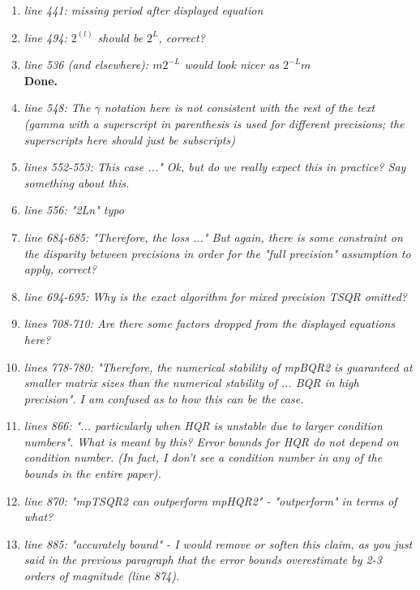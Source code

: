 \documentclass[final,onefignum,onetabnum]{siamart190516}
\begin{document}
\begin{enumerate}
    \item {\it line 441: missing period after displayed equation }
    \item {\it line 494: $2^{(l)}$ should be $2^L$, correct? }
    \item {\it line 536 (and elsewhere): $m2^{-L}$ would look nicer as $2^{-L}m$ }\\
    {\bf Done.}
    \item {\it line 548: The $\gamma$ notation here is not consistent with the rest of the text (gamma with a superscript in parenthesis is used for different precisions; the superscripts here should just be subscripts) }
    \item {\it lines 552-553: This case ..." Ok, but do we really expect this in practice? Say something about this. }
    \item {\it line 556: "2Ln" typo }
    \item {\it line 684-685: "Therefore, the loss ..." But again, there is some constraint on the disparity between precisions in order for the "full precision" assumption to apply, correct? }
    \item {\it line 694-695: Why is the exact algorithm for mixed precision TSQR omitted? }
    \item {\it lines 708-710: Are there some factors dropped from the displayed equations here? }
    \item {\it lines 778-780: "Therefore, the numerical stability of mpBQR2 is guaranteed at smaller matrix sizes than the numerical stability of ... BQR in high precision". I am confused as to how this can be the case. }
    \item {\it lines 866: "... particularly when HQR is unstable due to larger condition numbers". What is meant by this? Error bounds for HQR do not depend on condition number. (In fact, I don't see a condition number in any of the bounds in the entire paper). }
    \item {\it line 870: "mpTSQR2 can outperform mpHQR2" - "outperform" in terms of what? }
    \item {\it line 885: "accurately bound" - I would remove or soften this claim, as you just said in the previous paragraph that the error bounds overestimate by 2-3 orders of magnitude (line 874).}
\end{enumerate}
\end{document}
